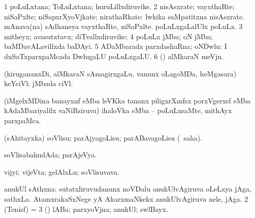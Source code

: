 \bentry
{} 
\gl{\nA}
\bmng
\bnum
\num{1} poLuLxtana; ToLuLxtana; huruLillxdiruvike. 
\num{2} nisAsxrate; vayxthaRte; niSaPxlte; niSapxrXyoVjkate; nirathaRkate:  lwkika saMpatitxna nisAsxrate.  mAnava(na) sAdhaneya vayxthaRte, niSaPxlte.  poLuLxgaLalUlx poLuLx. 
\num{3} mitheyx; avasutxtavx; diTvallxdiruvike; 
\num{4} poLuLx jMba; oN jMba; baMDavALavillxda baDAyi. 
\num{5} ADaMbarada parxdashaRna; oNDwlu:  I duSaTxparxpaMcada DwlugaLU poLuLxgaLU. 
\num{6} (\ame) alMkaraN meVju. 
\enum
\emng
\eentry

\bentry
{}
\gl{\nA}
\expl{}
\bmng
 (kirugananxDi, alMkaraN sAmagirxgaLu, \mo vanunx oLagoMDa, heMgasara) keYciVl; jMbada ciVl. 
\emng
\eentry

\bentry
{}
\gl{\nA}
\expl{}
\bmng
\emng
\eentry

\bentry
{}
\gl{\nA}
\expl{}
\bmng
 (iMgelxMDina banayxnf eMba leVKka tananx piligxrXmfsx porxVgerxsf eMba kAdaMbariyalilx vaNiRsiruva) ihaloVka eMba -- poLuLxsaMte, mithAyx parxpaMca. 
\emng
\eentry

\bentry
{}
\gl{\nA}
\expl{}
\bmng
\emng
\eentry

\bentry
{} 
\gl{\akirx}
\expl{}
\bmng
 (sAhitayxka) soVlisu; parAjyagoLisu; parABavagoLisu (\rUpa\ saha). 
\emng
\eentry

\bentry
{} 
\gl{\gu}
\expl{}
\bmng
 soVlisabahudAda; parAjeVya. 
\emng
\eentry

\bentry
{} 
\gl{\nA}
\expl{}
\bmng
 vijyi; vijeVta; gelAlxLu; soVlisuvava. 
\emng
\eentry

\bentry
{} 
\gl{\nA}
\expl{}
\bmng
\bnum
{} anukUl sAthxna: 
\banum
{} sutatxliruvudanunx noVDalu anukUlvAgiruva oLeLxya jAga, sathxLa. 
 AtamxrakaSxNege yA AkarxmaNkekx anukUlvAgiruva nele, jAga. 
\eanum
\numie
\num{2} (Tenisf) =  
\num{3} (\pArxparx) lABa; parxyoVjna; anukUl; swlBayx. 
\enum
\emng
\eentry

